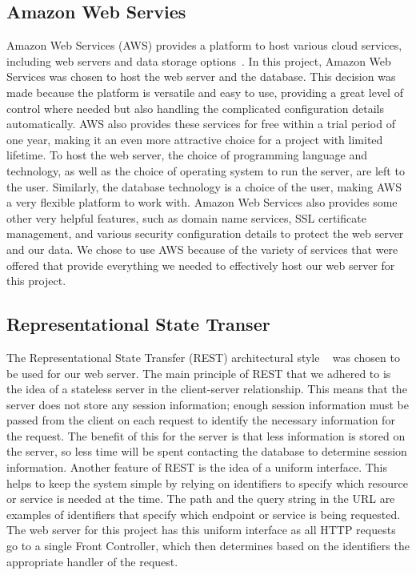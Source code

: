 \documentclass[12pt]{report}
\let\Oldsubsection\subsection
\renewcommand{\subsection}{\FloatBarrier\Oldsubsection}
\begin{document}
\subsection{Amazon Web Servies} \label{amazon-web-servies}


Amazon Web Services (AWS) provides a platform to host various cloud services,
including web servers and data storage options~\autocite{AMAZONWEBSERVICES}. In this
project, Amazon Web Services was chosen to host the web server and the database. This
decision was made because the platform is versatile and easy to use, providing a great level of
control where needed but also handling the complicated configuration details automatically.
AWS also provides these services for free within a trial period of one year, making it an even
more attractive choice for a project with limited lifetime. To host the web server, the choice of
programming language and technology, as well as the choice of operating system to run the
server, are left to the user. Similarly, the database technology is a choice of the user, making
AWS a very flexible platform to work with. Amazon Web Services also provides some other
very helpful features, such as domain name services, SSL certificate management, and various
security configuration details to protect the web server and our data. We chose to use AWS
because of the variety of services that were offered that provide everything we needed to
effectively host our web server for this project.

\subsection{Representational State Transer} \label{representational-state-transer}


The Representational State Transfer (REST) architectural style ~\autocite{RESTARCHSTYLE} was chosen to be used
for our web server. The main principle of REST that we adhered to is the idea of a stateless
server in the client-server relationship. This means that the server does not store any session
information; enough session information must be passed from the client on each request to
identify the necessary information for the request. The benefit of this for the server is that less
information is stored on the server, so less time will be spent contacting the database to
determine session information. Another feature of REST is the idea of a uniform interface. This
helps to keep the system simple by relying on identifiers to specify which resource or service is
needed at the time. The path and the query string in the URL are examples of identifiers that
specify which endpoint or service is being requested. The web server for this project has this
uniform interface as all HTTP requests go to a single Front Controller, which
then determines based on the identifiers the appropriate handler of the request.
\end{document}
